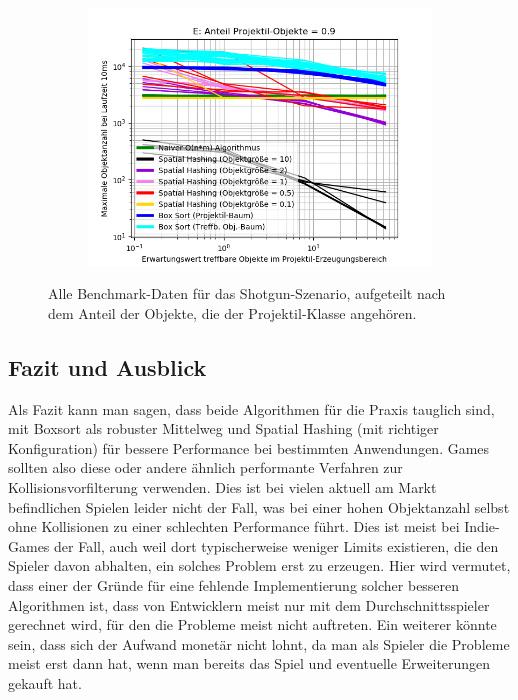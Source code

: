 \begin{figure}
\begin{subfigure}[t]{0.55\textwidth}
		\label{fig:shotgunComparison-D}
	\end{subfigure}
~
	\begin{subfigure}[t]{0.55\textwidth}
		\centering
		\includegraphics[width=1\textwidth]{./res/shotgunComparison-E.png}

		\label{fig:shotgunComparison-E}
	\end{subfigure}

	\caption{Alle Benchmark-Daten für das Shotgun-Szenario, aufgeteilt nach dem Anteil der Objekte, die der Projektil-Klasse angehören.}
	\label{fig:shotgunComparison}
\end{figure}

\subsection{Fazit und Ausblick}
Als Fazit kann man sagen, dass beide Algorithmen für die Praxis tauglich sind, mit Boxsort als robuster Mittelweg und  Spatial Hashing (mit richtiger Konfiguration) für bessere Performance bei bestimmten Anwendungen. Games sollten also diese oder andere ähnlich performante Verfahren zur Kollisionsvorfilterung verwenden. Dies ist bei vielen aktuell am Markt befindlichen Spielen leider nicht der Fall, was bei einer hohen Objektanzahl selbst ohne Kollisionen zu einer schlechten Performance führt. Dies ist meist bei Indie-Games der Fall, auch weil dort typischerweise weniger Limits existieren, die den Spieler davon abhalten, ein solches Problem erst zu erzeugen. Hier wird vermutet, dass einer der Gründe für eine fehlende Implementierung solcher besseren Algorithmen ist, dass von Entwicklern meist nur mit dem Durchschnittsspieler gerechnet wird, für den die Probleme meist nicht auftreten. Ein weiterer könnte sein, dass sich der Aufwand monetär nicht lohnt, da man als Spieler die Probleme meist erst dann hat, wenn man bereits das Spiel und eventuelle Erweiterungen gekauft hat.\\

